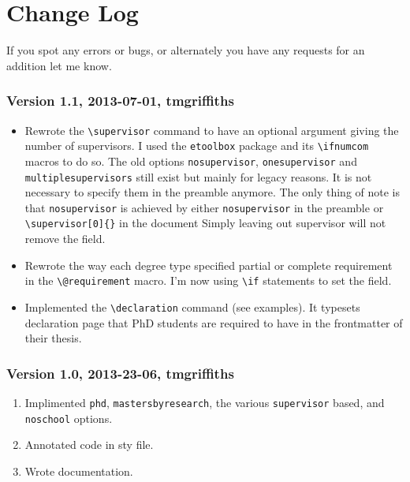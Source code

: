 \documentclass[12pt,oneside]{article}
\newcommand{\oporcom}[1]{\texttt{\color{RoyalBlue}#1}} %
\begin{document}
\section{Change Log}
If you spot any errors or bugs, or alternately you have any requests for an addition let me know.
\subsubsection*{Version 1.1, 2013-07-01, tmgriffiths}
\begin{itemize}
    \item Rewrote the \oporcom{\textbackslash{}supervisor} command to have an optional argument giving the number of supervisors. I used the \texttt{etoolbox} package and its \texttt{\textbackslash{}ifnumcom} macros to do so. The old options \oporcom{nosupervisor}, \oporcom{onesupervisor} and \oporcom{multiplesupervisors} still exist but mainly for legacy reasons. It is not necessary to specify them in the preamble anymore. The only thing of note is that \oporcom{nosupervisor} is achieved by either \oporcom{nosupervisor} in the preamble or \oporcom{\textbackslash{}supervisor}\texttt{[0]\{\}} in the document Simply leaving out supervisor will not remove the field.
    \item Rewrote the way each degree type specified partial or complete requirement in the \oporcom{\textbackslash{}@requirement} macro. I'm now using \texttt{\textbackslash{}if} statements to set the field.
    \item Implemented the \oporcom{\textbackslash{}declaration} command (see examples). It typesets declaration page that PhD students are required to have in the frontmatter of their thesis.
\end{itemize}

\subsubsection*{Version 1.0, 2013-23-06, tmgriffiths}
\begin{enumerate}
    \item Implimented \oporcom{phd}, \oporcom{mastersbyresearch}, the various \oporcom{supervisor} based, and \oporcom{noschool} options.
    \item Annotated code in sty file.
    \item Wrote documentation.
\end{enumerate}
\end{document}
